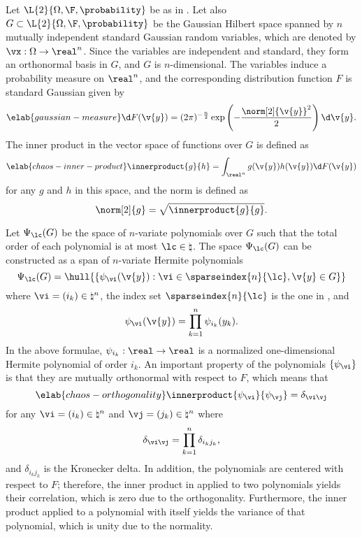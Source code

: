 Let $\L{2}{\Omega, \F, \probability}$ be as in .
Let also $G \subset \L{2}{\Omega, \F, \probability}$ be the Gaussian Hilbert
space \cite{janson1997} spanned by $n$ mutually independent standard Gaussian
random variables, which are denoted by $\vx: \Omega \to \real^n$. Since the
variables are independent and standard, they form an orthonormal basis in $G$,
and $G$ is $n$-dimensional. The variables induce a probability measure on
$\real^n$, and the corresponding distribution function $F$ is standard Gaussian
given by
\begin{equation} \elab{gaussian-measure}
  \d F(\v{y}) = (2 \pi)^{-\frac{n}{2}} \exp\left(-\frac{\norm[2]{\v{y}}^2}{2}\right) \d \v{y}.
\end{equation}
The inner product in the vector space of functions over $G$ is defined as
\begin{equation} \elab{chaos-inner-product}
  \innerproduct{g}{h} = \int_{\real^n} g(\v{y}) h(\v{y}) \d F(\v{y})
\end{equation}
for any $g$ and $h$ in this space, and the norm is defined as
\[
  \norm[2]{g} = \sqrt{\innerproduct{g}{g}}.
\]

Let $\Psi_\lc(G)$ be the space of $n$-variate polynomials over $G$ such that the
total order of each polynomial is at most $\lc \in \natural$. The space
$\Psi_\lc(G)$ can be constructed as a span of $n$-variate Hermite polynomials
\cite{eldred2008, maitre2010}
\[
  \Psi_\lc(G) = \hull{\left\{ \psi_{\vi}(\v{y}): \vi \in \sparseindex{n}{\lc}, \v{y} \in G \right\}}
\]
where $\vi = (i_k) \in \natural^n$, the index set $\sparseindex{n}{\lc}$ is the
one in , and
\[
  \psi_{\vi}(\v{y}) = \prod_{k = 1}^n \psi_{i_k}(y_k).
\]
In the above formulae, $\psi_{i_k}: \real \to \real$ is a normalized
one-dimensional Hermite polynomial of order $i_k$. An important property of the
polynomials $\{ \psi_{\vi} \}$ is that they are mutually orthonormal with
respect to $F$, which means that
\begin{equation} \elab{chaos-orthogonality}
  \innerproduct{\psi_{\vi}}{\psi_{\vj}} = \delta_{\vi \vj}
\end{equation}
for any $\vi = (i_k) \in \natural^n$ and $\vj = (j_k) \in \natural^n$ where
\[
  \delta_{\vi \vj} = \prod_{k = 1}^n \delta_{i_k j_k},
\]
and $\delta_{i_k j_k}$ is the Kronecker delta. In addition, the polynomials are
centered with respect to $F$; therefore, the inner product in
 applied to two polynomials yields their correlation,
which is zero due to the orthogonality. Furthermore, the inner product applied
to a polynomial with itself yields the variance of that polynomial, which is
unity due to the normality.

